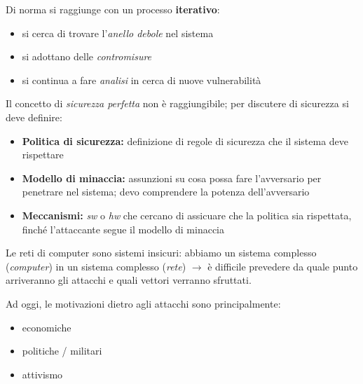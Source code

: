 \noindent Di norma si raggiunge con un processo \textbf{iterativo}:
\begin{itemize}
    \item si cerca di trovare l'\textit{anello debole} nel sistema 
    \item si adottano delle \textit{contromisure}
    \item si continua a fare \textit{analisi} in cerca di nuove vulnerabilità
\end{itemize}

\noindent Il concetto di \textit{sicurezza perfetta} non è raggiungibile; per discutere
di sicurezza si deve definire:
\begin{itemize}
    \item \textbf{Politica di sicurezza:} definizione di regole di sicurezza che il sistema 
    deve rispettare
    \item \textbf{Modello di minaccia:} assunzioni su cosa possa fare l'avversario per penetrare
    nel sistema; devo comprendere la potenza dell'avversario
    \item \textbf{Meccanismi:} \textit{sw} o \textit{hw} che cercano di assicuare che la politica sia 
    rispettata, finché l'attaccante segue il modello di minaccia
\end{itemize} 

\noindent Le reti di computer sono sistemi insicuri: abbiamo un sistema complesso (\textit{computer}) in 
un sistema complesso (\textit{rete}) $\rightarrow$ è difficile prevedere da quale punto 
arriveranno gli attacchi e quali vettori verranno sfruttati.

\noindent Ad oggi, le motivazioni dietro agli attacchi sono principalmente:
\begin{itemize}
    \item economiche 
    \item politiche / militari 
    \item attivismo
\end{itemize}


















